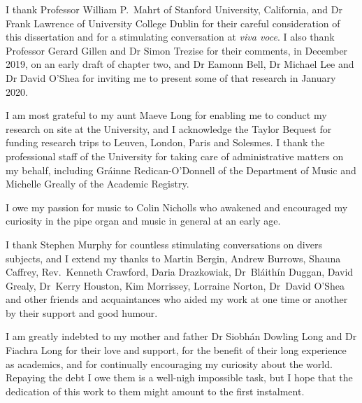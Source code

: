 I thank Professor William P.\ Mahrt of Stanford University, California, and Dr Frank Lawrence of University College Dublin for their careful consideration of this dissertation and for a stimulating conversation at \emph{viva voce}.
I also thank Professor Gerard Gillen and Dr Simon Trezise for their comments, in December 2019, on an early draft of chapter two, and Dr Eamonn Bell, Dr Michael Lee and Dr David O'Shea for inviting me to present some of that research in January 2020.

I am most grateful to my aunt Maeve Long for enabling me to conduct my research on site at the University, and I acknowledge the Taylor Bequest for funding research trips to Leuven, London, Paris and Solesmes.
I thank the professional staff of the University for taking care of administrative matters on my behalf, including Gráinne Redican-O'Donnell of the Department of Music and Michelle Greally of the Academic Registry.

I owe my passion for music to Colin Nicholls who awakened and encouraged my curiosity in the pipe organ and music in general at an early age.

I thank Stephen Murphy for countless stimulating conversations on divers subjects, and I extend my thanks to Martin Bergin, Andrew Burrows, Shauna Caffrey, Rev.\ Kenneth Crawford, Daria Drazkowiak, Dr~Bláithín Duggan, David Grealy, Dr~Kerry Houston, Kim Morrissey, Lorraine Norton, Dr~David O'Shea and other friends and acquaintances who aided my work at one time or another by their support and good humour.

I am greatly indebted to my mother and father Dr Siobhán Dowling Long and \linebreak{}Dr Fiachra Long for their love and support, for the benefit of their long experience as academics, and for continually encouraging my curiosity about the world.
Repaying the debt I owe them is a well-nigh impossible task, but I hope that the dedication of this work to them might amount to the first instalment.
